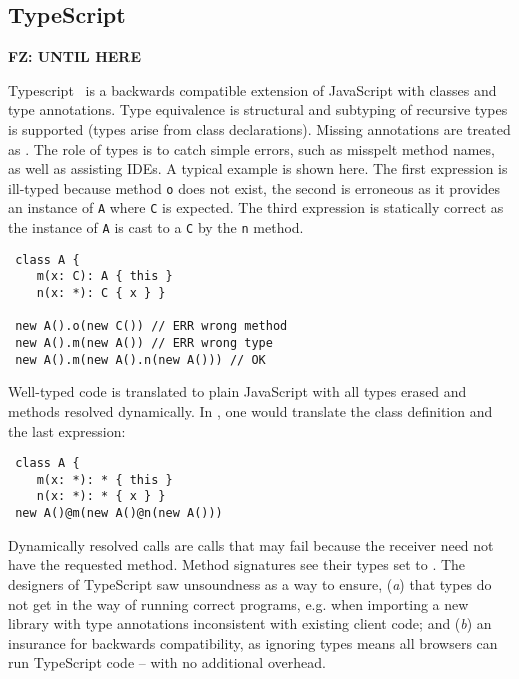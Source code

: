 \documentclass[acmlarge, anonymous, authordraft]{acmart}
\newcommand{\code}[1]{{\tt #1}\xspace}
\newcommand{\FZ}[1]{\textbf{FZ: #1}}
\begin{document}
%
%
%
%


\subsection{TypeScript}

\FZ{UNTIL HERE}

Typescript~\cite{BAT14} is a backwards compatible extension of JavaScript
with classes and type annotations. Type equivalence is structural and
subtyping of recursive types is supported (types arise from class
declarations). Missing annotations are treated as \any. The role of types is
to catch simple errors, such as misspelt method names, as well as assisting
IDEs.  A typical example is shown here. The first expression is ill-typed
because method \code o does not exist, the second is erroneous as it
provides an instance of \code A where \code C is expected. The third
expression is statically correct as the instance of \code A is cast to a
\code C by the \code{n} method.

\begin{lstlisting}
 class A { 
    m(x: C): A { this }
    n(x: *): C { x } }

 new A().o(new C()) // ERR wrong method
 new A().m(new A()) // ERR wrong type
 new A().m(new A().n(new A())) // OK 
\end{lstlisting}

\noindent
Well-typed code is translated to plain JavaScript with all types erased and
methods resolved dynamically. In \kafka, one would translate the class
definition and the last expression:

\begin{lstlisting}
 class A { 
    m(x: *): * { this }
    n(x: *): * { x } }
 new A()@m(new A()@n(new A()))    
\end{lstlisting}

\noindent Dynamically resolved calls are calls that may fail because the
receiver need not have the requested method. Method signatures see their
types set to \any.  The designers of TypeScript saw unsoundness as a way to
ensure, ({\em a}) that types do not get in the way of running correct
programs, e.g. when importing a new library with type annotations
inconsistent with existing client code; and ({\em b}) an insurance for
backwards compatibility, as ignoring types means all browsers can run
TypeScript code -- with no additional overhead.
\end{document}
